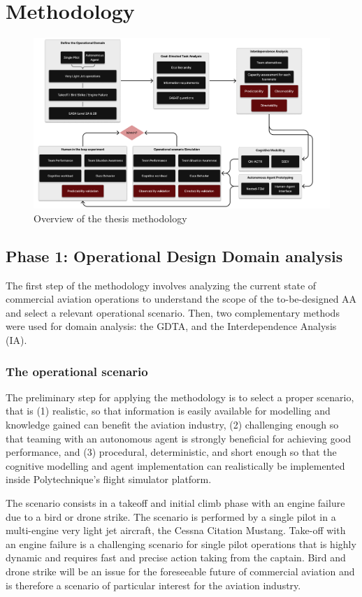 \documentclass[12pt,a4paper]{article} %
\begin{document}
	\section{Methodology} 

	\begin{figure}[H]
		\centering
		\includegraphics[width=1.1\textwidth]{images/methodology_hat.png}
		\caption{Overview of the thesis methodology}
	\end{figure}

	\subsection{Phase 1: Operational Design Domain analysis}
	The first step of the methodology involves analyzing the current state of commercial aviation operations to understand the scope of the to-be-designed AA and select a relevant operational scenario. Then, two complementary methods were used for domain analysis: the GDTA, and the Interdependence Analysis (IA).

	\subsubsection{The operational scenario}
	The preliminary step for applying the methodology is to select a proper scenario, that is (1) realistic, so that information is easily available for modelling and knowledge gained can benefit the aviation industry, (2) challenging enough so that teaming with an autonomous agent is strongly beneficial for achieving good performance, and (3) procedural, deterministic, and short enough so that the cognitive modelling and agent implementation can realistically be implemented inside Polytechnique's flight simulator platform.
	
	The scenario consists in a takeoff and initial climb phase with an engine failure due to a bird or drone strike. The scenario is performed by a single pilot in a multi-engine very light jet aircraft, the Cessna Citation Mustang. Take-off with an engine failure is a challenging scenario for single pilot operations that is highly dynamic and requires fast and precise action taking from the captain. Bird and drone strike will be an issue for the foreseeable future of commercial aviation and is therefore a scenario of particular interest for the aviation industry.
\end{document}
